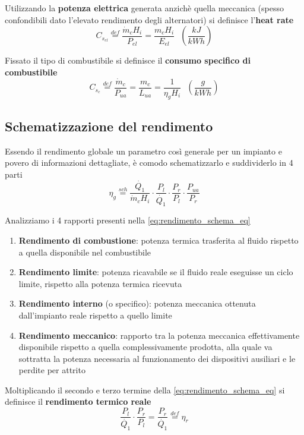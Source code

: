 \documentclass[a4paper,10pt]{article}
\begin{document}
Utilizzando la \textbf{potenza elettrica} generata anzichè quella meccanica
(spesso confondibili dato l'elevato rendimento degli alternatori) si definisce
l'\textbf{heat rate}
\begin{equation}
 C_{s_{el}} \stackrel{def}{=} \frac{\dot{m}_c H_i}{P_{el}} = \frac{m_c H_i}{E_{el}} \ \ \ \left(\frac{kJ}{kWh} \right)
\end{equation}

Fissato il tipo di combustibile si definisce il \textbf{consumo specifico di combustibile}
\begin{equation}
C_{s_c} \stackrel{def}{=} \frac{\dot{m}_c}{P_{ua}} = \frac{m_c}{L_{ua}} = \frac{1}{\eta_gH_i} \ \ \ \left(\frac{g}{kWh} \right)
\end{equation}
\subsection*{Schematizzazione del rendimento}
\label{sec:rendimento_schema}
Essendo il rendimento globale un parametro così generale per un impianto e povero
di informazioni dettagliate, è comodo schematizzarlo e suddividerlo in 4 parti
\begin{equation}
\label{eq:rendimento_schema_eq}
 \eta_g \stackrel{sch}{=} \frac{\dot{Q_1}}{\dot{m}_c H_i}\cdot \frac{P_l}{\dot{Q_1}}\cdot \frac{P_r}{P_l}\cdot \frac{P_{ua}}{P_r}
\end{equation}

Analizziamo i 4 rapporti presenti nella \eqref{eq:rendimento_schema_eq}
\begin{enumerate}
\item \textbf{Rendimento di combustione}: potenza termica trasferita al fluido rispetto
a quella disponibile nel combustibile

\item \textbf{Rendimento limite}:
potenza ricavabile se il fluido reale eseguisse un ciclo limite, rispetto alla potenza
termica ricevuta

\item \textbf{Rendimento interno} (o specifico): potenza meccanica ottenuta dall'impianto reale 
rispetto a quello limite

\item \textbf{Rendimento meccanico}: rapporto tra la potenza meccanica effettivamente 
disponibile rispetto a quella complessivamente prodotta, alla quale va sottratta la 
potenza necessaria al funzionamento dei dispositivi ausiliari e le perdite per attrito
\end{enumerate}

Moltiplicando il secondo e terzo termine della \eqref{eq:rendimento_schema_eq} si 
definisce il \textbf{rendimento termico reale}
\begin{equation}
\label{eq:rendimento_reale}
 \frac{P_l}{\dot{Q_1}}\cdot \frac{P_r}{P_l} = \frac{P_r}{\dot{Q_1}} \stackrel{def}{=} \eta_r
\end{equation}
\end{document}
